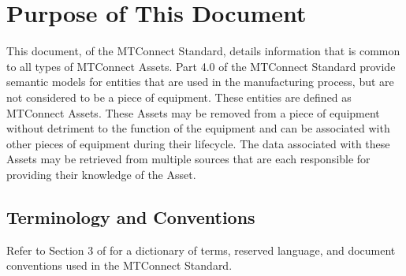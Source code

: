 
\section{Purpose of This Document}
\label{sec:Purpose of This Document}

This document,  of the MTConnect Standard, details information that is common to all types of \glspl{MTConnect Asset}.  Part 4.0 of the MTConnect Standard provide semantic models for entities that are used in the manufacturing process, but are not considered to be a piece of equipment.  These entities are defined as \glspl{MTConnect Asset}.  These \glspl{Asset} may be removed from a piece of equipment without detriment to the function of the equipment and can be associated with other pieces of equipment during their lifecycle.  The data associated with these \glspl{Asset} may be retrieved from multiple sources that are each responsible for providing their knowledge of the \gls{Asset}.

\subsection{Terminology and Conventions}
\label{sec:Terminology and Conventions}

Refer to Section 3 of  for a dictionary of terms, reserved language, and document conventions used in the MTConnect Standard.

\printglossary[title=General Terms, type=general]
\printglossary[title=Information Model Terms, type=informationmodel]
\printglossary[title=Protocol Terms, type=protocol]
\printglossary[title=HTTP Terms, type=http]
\printglossary[title=XML Terms, type=xml]
\printglossary[title=Concept Model Terms, type=conceptmodel]

\printacronyms

\printbibliography[title=MTConnect References,keyword=MTC]

\printbibliography[title=Other References,notkeyword=MTC]

\glsaddall